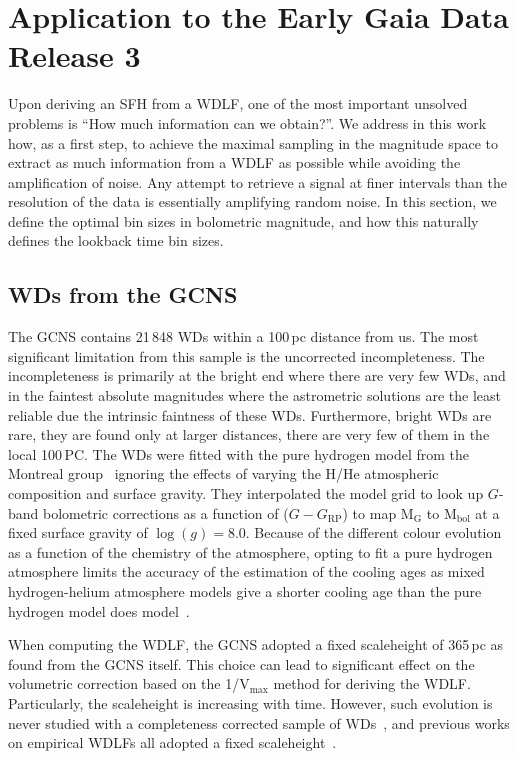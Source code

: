 \documentclass[fleqn,usenatbib]{mnras}
\begin{document}
\section{Application to the Early Gaia Data Release 3}
\label{sec:application}
Upon deriving an SFH from a WDLF, one of the most important unsolved problems
is ``How much information can we obtain?''. We address in this work how, as a
first step, to achieve the maximal sampling in the magnitude space to extract
as much information from a WDLF as possible while avoiding the amplification of
noise. Any attempt to retrieve a signal at finer intervals than the
resolution of the data is essentially amplifying random noise. In this section,
we define the optimal bin sizes in bolometric magnitude, and how this naturally
defines the lookback time bin sizes.

\subsection{WDs from the GCNS}
The GCNS contains 21\,848 WDs within a 100\,pc distance from us. The most
significant limitation from this sample is the uncorrected incompleteness. The
incompleteness is primarily at the bright end where there are very few WDs, and
in the faintest absolute magnitudes where the astrometric solutions are the
least reliable due the intrinsic faintness of these WDs. Furthermore, bright
WDs are rare, they are found only at larger distances, there are very few of
them in the local 100\,PC. The WDs were fitted with the pure hydrogen model from
the Montreal group~\citep{2019ApJ...876...67B} ignoring the effects of varying
the H/He atmospheric composition and surface gravity. They interpolated the
model grid to look up $G$-band bolometric corrections as a function
of ($G - G_{\mathrm{RP}}$) to map M$_\mathrm{G}$ to M$_{\mathrm{bol}}$ at
a fixed surface gravity of $\log(g)=8.0$. Because of the different colour
evolution as a function of the chemistry of the atmosphere, opting to fit a
pure hydrogen atmosphere limits the accuracy of the estimation of the cooling
ages as mixed hydrogen-helium atmosphere models give a shorter cooling age than
the pure hydrogen model does model~\citep{2022ApJ...934...36B}. 

When computing the WDLF, the GCNS adopted a fixed scaleheight of 365\,pc as
found from the GCNS itself. This choice can lead to significant effect on the
volumetric correction based on the 1/V$_{\mathrm{max}}$ method for deriving the
WDLF. Particularly, the scaleheight is increasing with time. However, such
evolution is never studied with a completeness corrected sample of
WDs~\citep{2006AJ....131..571H}, and previous works on empirical WDLFs all
adopted a fixed scaleheight~\citep{2006AJ....131..571H, 2011MNRAS.417...93R,
2019MNRAS.482..715L}.
\end{document}
